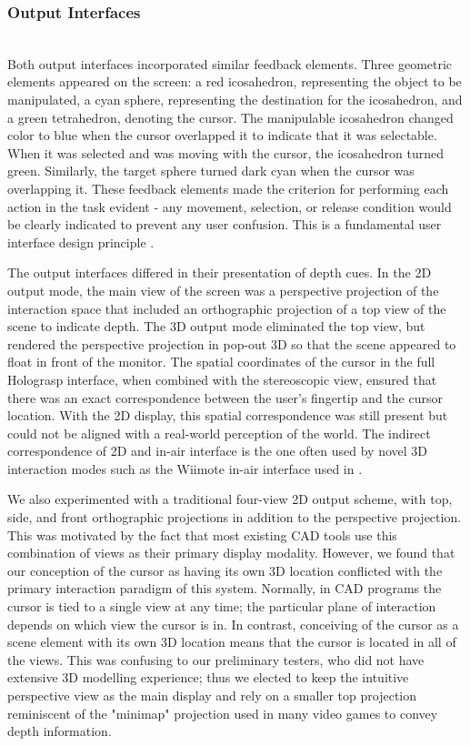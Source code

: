 \documentclass[pageno]{jpaper}
\begin{document}
\subsubsection{Output Interfaces}$ $\\
Both output interfaces incorporated similar feedback elements. Three geometric elements
appeared on the screen: a red icosahedron, representing the object to be manipulated, a
cyan sphere, representing the destination for the icosahedron, and a green tetrahedron,
denoting the cursor. The manipulable icosahedron changed color to blue when the cursor
overlapped it to indicate that it was selectable. When it was selected and was moving
with the cursor, the icosahedron turned green. Similarly, the target sphere turned dark
cyan when the cursor was overlapping it. These feedback elements made the criterion for
performing each action in the task evident -
any movement, selection, or release condition would be clearly indicated to prevent any user
confusion. This is a fundamental user interface design principle \cite{bravenuiworld}.

The output interfaces differed in their presentation of depth cues. In the 2D output mode,
the main view of the screen was a perspective projection of the interaction space that
included an orthographic projection of a top view of the scene to indicate depth. The 3D output mode eliminated the top
view, but rendered the perspective projection in pop-out 3D so that the scene appeared to
float in front of the monitor. The spatial coordinates of the cursor in the full Holograsp interface, when combined
with the stereoscopic view, ensured that there was an exact correspondence between the user's fingertip
and the cursor location. With the 2D display, this spatial correspondence was still present but could not
be aligned with a real-world perception of the world. The indirect correspondence of 2D and in-air interface is the one
often used by novel 3D interaction modes such as the Wiimote in-air interface used in \cite{study1}.

We also experimented with a traditional four-view 2D output
scheme, with top, side, and front orthographic projections in addition to the perspective projection.
This was motivated by the fact that most existing CAD tools use this combination of views as their
primary display modality. However, we found that our conception of the cursor as having its own
3D location conflicted with the primary interaction paradigm of this system. Normally, in CAD programs
the cursor is tied to a single view at any time; the particular plane of interaction depends on which view
the cursor is in. In contrast, conceiving of the cursor as a scene element with its own 3D location means
that the cursor is located in all of the views. This was confusing to our preliminary testers, who did not
have extensive 3D modelling experience; thus we elected to keep the intuitive perspective view as the
main display and rely on a smaller top projection reminiscent of the "minimap" projection used in many
video games to convey depth information.
\end{document}
